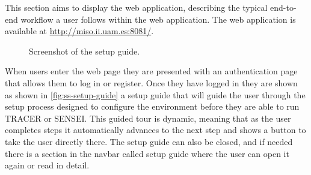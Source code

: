 This section aims to display the web application,
describing the typical end-to-end workflow
a user follows within the web application.
The web application is available at \url{http://miso.ii.uam.es:8081/}.

\begin{figure}[htpb]
  \centering
  \caption{Screenshot of the setup guide.}
  \label{fig:ss-setup-guide}
\end{figure}

When users enter the web page
they are presented with an authentication page
that allows them to log in or register.
Once they have logged in they are shown
as shown in \autoref{fig:ss-setup-guide}
a setup guide that will guide the user
through the setup process designed to configure the environment
before they are able to run \ac{TRACER} or SENSEI.
This guided tour is dynamic,
meaning that as the user completes steps
it automatically advances to the next step
and shows a button to take the user directly there.
The setup guide can also be closed,
and if needed there is a section in the navbar called setup guide
where the user can open it again or read in detail.

